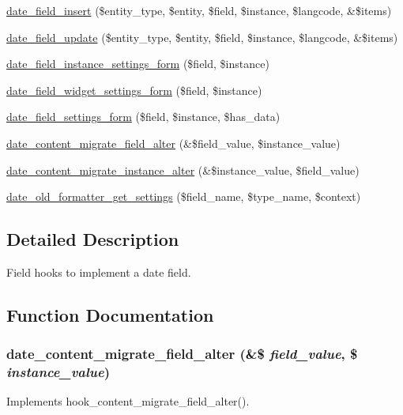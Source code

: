 \begin{DoxyCompactItemize}
\hyperlink{date_8field_8inc_a52037db7c9418598fb3b1a424f24f4c8}{date\_\-field\_\-insert} (\$entity\_\-type, \$entity, \$field, \$instance, \$langcode, \&\$items)
\item 
\hyperlink{date_8field_8inc_a655f21522e69937fc4b8c8de19e395cf}{date\_\-field\_\-update} (\$entity\_\-type, \$entity, \$field, \$instance, \$langcode, \&\$items)
\item 
\hyperlink{date_8field_8inc_a97ac17d2d8933d34f7575b0db8f226b8}{date\_\-field\_\-instance\_\-settings\_\-form} (\$field, \$instance)
\item 
\hyperlink{date_8field_8inc_aacfb6134f4d15984d676313004bc7939}{date\_\-field\_\-widget\_\-settings\_\-form} (\$field, \$instance)
\item 
\hyperlink{date_8field_8inc_a5f070593dfcf73a90c953b2402e0739b}{date\_\-field\_\-settings\_\-form} (\$field, \$instance, \$has\_\-data)
\item 
\hyperlink{date_8field_8inc_adfe0797df2b0066c049c24ed53cc0e2d}{date\_\-content\_\-migrate\_\-field\_\-alter} (\&\$field\_\-value, \$instance\_\-value)
\item 
\hyperlink{date_8field_8inc_a9ac2d36de9d064358aa6aa0fbdc7ce55}{date\_\-content\_\-migrate\_\-instance\_\-alter} (\&\$instance\_\-value, \$field\_\-value)
\item 
\hyperlink{date_8field_8inc_a6e4aa76c83e765e2b7e3dfdcd0903479}{date\_\-old\_\-formatter\_\-get\_\-settings} (\$field\_\-name, \$type\_\-name, \$context)
\end{DoxyCompactItemize}


\subsection{Detailed Description}
Field hooks to implement a date field. 

\subsection{Function Documentation}
\hypertarget{date_8field_8inc_adfe0797df2b0066c049c24ed53cc0e2d}{
\subsubsection[{date\_\-content\_\-migrate\_\-field\_\-alter}]{\setlength{\rightskip}{0pt plus 5cm}date\_\-content\_\-migrate\_\-field\_\-alter (\&\$ {\em field\_\-value}, \/  \$ {\em instance\_\-value})}}
\label{date_8field_8inc_adfe0797df2b0066c049c24ed53cc0e2d}
Implements hook\_\-content\_\-migrate\_\-field\_\-alter().

